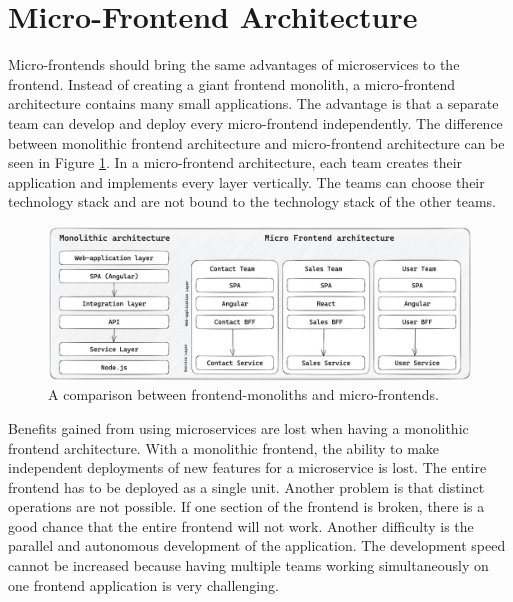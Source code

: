 \section{Micro-Frontend Architecture}\label{section:background:micro-frontend-architecture}

Micro-frontends should bring the same advantages of microservices to the frontend. Instead of creating a giant frontend monolith, a micro-frontend architecture contains many small applications. The advantage is that a separate team can develop and deploy every micro-frontend independently. \cite{book:2020:geers:background:micro-frontends:micro-frontends-in-action} The difference between monolithic frontend architecture and micro-frontend architecture can be seen in Figure \ref{fig:background:micro-frontend:monolith-micro-frontend-comparison}. In a micro-frontend architecture, each team creates their application and implements every layer vertically. The teams can choose their technology stack and are not bound to the technology stack of the other teams.

\ifshowImages
\begin{figure}[H]
  \centering
  \includegraphics[width=1\linewidth]{images/background/micro-frontends/monolith-micro-frontends-comparison.jpg}
  \caption{A comparison between frontend-monoliths and micro-frontends.}\label{fig:background:micro-frontend:monolith-micro-frontend-comparison}
\end{figure}
\fi

\noindent Benefits gained from using microservices are lost when having a monolithic frontend architecture. With a monolithic frontend, the ability to make independent deployments of new features for a microservice is lost. The entire frontend has to be deployed as a single unit. Another problem is that distinct operations are not possible. If one section of the frontend is broken, there is a good chance that the entire frontend will not work. Another difficulty is the parallel and autonomous development of the application. The development speed cannot be increased because having multiple teams working simultaneously on one frontend application is very challenging. \cite{misc:2019:leitner:background:micro-frontends:micro-frontends-basics}

